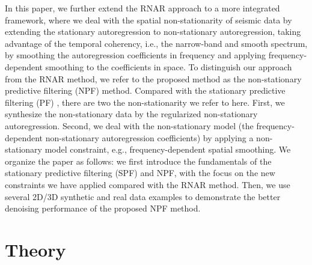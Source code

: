 In this paper, we further extend the RNAR approach to a more integrated framework, where we deal with the spatial non-stationarity of seismic data by extending the stationary autoregression to non-stationary autoregression, taking advantage of the temporal coherency, i.e., the narrow-band and smooth spectrum, by smoothing the autoregression coefficients in frequency and applying frequency-dependent smoothing to the coefficients in space.  To distinguish our approach from the RNAR method, we refer to the proposed method as the non-stationary predictive filtering (NPF) method. Compared with the stationary predictive filtering (PF) \cite[]{canales1984}, there are two  the non-stationarity we refer to here. First, we synthesize the non-stationary data by the regularized non-stationary autoregression. Second, we deal with the non-stationary model (the frequency-dependent non-stationary autoregression coefficients) by applying a non-stationary model constraint, e.g., frequency-dependent spatial smoothing. We organize the paper as follows: we first introduce the fundamentals of the stationary predictive filtering (SPF) and NPF, with the focus on the new constraints we have applied compared with the RNAR method. Then, we use several 2D/3D synthetic and real data examples to demonstrate the better denoising performance of the proposed NPF method. 
\section{Theory}
